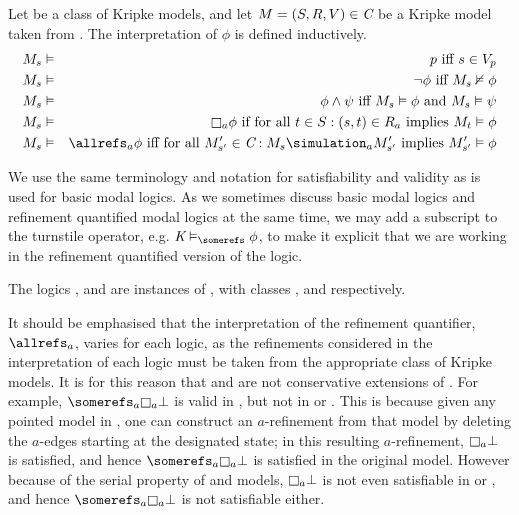 \begin{definition}
Let \classC{} be a class of Kripke models, and let $M = (S, R, V) \in \textit{C}$
be a Kripke model taken from \classC{}. The interpretation of $\phi$ is defined
inductively.
\begin{eqnarray*}
M_s &\entails& p \text{ iff } s \in V_p\\
M_s &\entails& \neg \phi \text{ iff } M_s \nentails \phi\\
M_s &\entails& \phi \land \psi \text{ iff } M_s \entails \phi \text{ and } M_s
\entails \psi\\
M_s &\entails& \knows_a \phi \text{ if for all } t \in S : (s, t) \in R_a \text{
implies } M_t \entails \phi\\
M_s &\entails& \allrefs_a \phi \text{ iff for all } M'_{s'} \in \classC : M_s
\simulation_a M'_{s'} \text{ implies } M'_{s'} \entails \phi
\end{eqnarray*}
\end{definition}

We use the same terminology and notation for satisfiability and validity as is
used for basic modal logics. As we sometimes discuss basic modal logics and
refinement quantified modal logics at the same time, we may add a subscript to
the turnstile operator, e.g. $\classK \entails_\somerefs \phi$, to make it
explicit that we are working in the refinement quantified version of the logic.

The logics \logicKF{}, \logicKDF{} and \logicSF{} are instances of \logicCF{},
with classes \classK{}, \classKD{} and \classS{} respectively. 

It should be emphasised that the interpretation of the refinement quantifier,
$\allrefs_a$, varies for each logic, as the refinements considered in the
interpretation of each logic must be taken from the appropriate class of Kripke
models. It is for this reason that \logicSF{} and \logicKDF{} are not
conservative extensions of \logicKF{}. For example, $\somerefs_a \knows_a \bot$
is valid in \logicKF{}, but not in \logicSF{} or \logicKDF{}. This is because
given any pointed model in \classK{}, one can construct an $a$-refinement from
that model by deleting the $a$-edges starting at the designated state; in this
resulting $a$-refinement, $\knows_a \bot$ is satisfied, and hence $\somerefs_a
\knows_a \bot$ is satisfied in the original model. However because of the serial
property of \classS{} and \classKD{} models, $\knows_a \bot$ is not even
satisfiable in \logicSF{} or \logicKDF{}, and hence $\somerefs_a \knows_a \bot$
is not satisfiable either.

